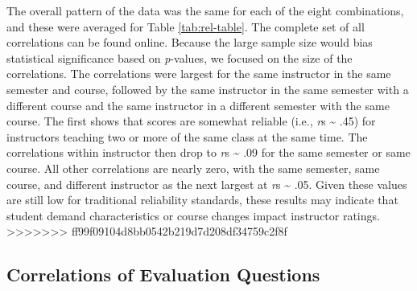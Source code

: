 \documentclass[man]{apa6}
\theoremstyle{definition}
\theoremstyle{definition}
\theoremstyle{definition}
\theoremstyle{remark}
\begin{document}
The overall pattern of the data was the same for each of the eight
combinations, and these were averaged for Table \ref{tab:rel-table}. The
complete set of all correlations can be found online. Because the large
sample size would bias statistical significance based on
\emph{p}-values, we focused on the size of the correlations. The
correlations were largest for the same instructor in the same semester
and course, followed by the same instructor in the same semester with a
different course and the same instructor in a different semester with
the same course. The first shows that scores are somewhat reliable
(i.e., \emph{r}s \textasciitilde{} .45) for instructors teaching two or
more of the same class at the same time. The correlations within
instructor then drop to \emph{r}s \textasciitilde{} .09 for the same
semester or same course. All other correlations are nearly zero, with
the same semester, same course, and different instructor as the next
largest at \emph{r}s \textasciitilde{} .05. Given these values are still
low for traditional reliability standards, these results may indicate
that student demand characteristics or course changes impact instructor
ratings.
\textgreater{}\textgreater{}\textgreater{}\textgreater{}\textgreater{}\textgreater{}\textgreater{}
ff99f09104d8bb0542b219d7d208df34759c2f8f

\subsection{Correlations of Evaluation
Questions}\label{correlations-of-evaluation-questions}
\end{document}
